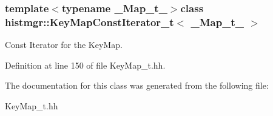 \subsubsection*{template$<$typename \-\_\-\-Map\-\_\-t\-\_\-$>$class histmgr\-::\-Key\-Map\-Const\-Iterator\-\_\-t$<$ \-\_\-\-Map\-\_\-t\-\_\- $>$}

Const Iterator for the Key\-Map. 

Definition at line 150 of file Key\-Map\-\_\-t.\-hh.



The documentation for this class was generated from the following file\-:\begin{DoxyCompactItemize}
\item 
Key\-Map\-\_\-t.\-hh\end{DoxyCompactItemize}
